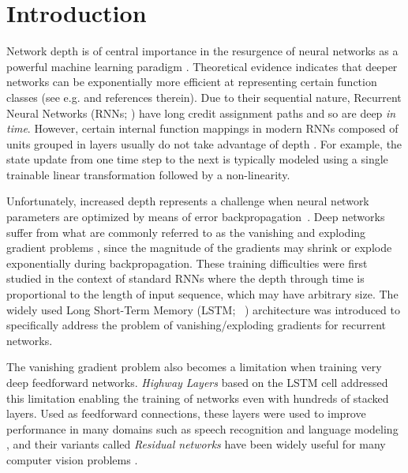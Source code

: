 \documentclass[letterpaper]{article}
\def\srnn{standard RNN}
\begin{document}
\section{Introduction}
\label{sec:introduction}
Network depth is of central importance in the resurgence of neural networks as a powerful machine learning paradigm \citep{schmidhuber2015deep}.
Theoretical evidence indicates that deeper networks can be exponentially more efficient at representing certain function classes (see e.g. \citet{bengio2007scaling,Bianchini2014} and references therein).
Due to their sequential nature, Recurrent Neural Networks (RNNs; \citealp{RobinsonFallside:87tr,werbos,Williams:89}) have long credit assignment paths and so are deep \emph{in time}.
However, certain internal function mappings in modern RNNs composed of units grouped in layers usually do not take advantage of depth \citep{pascanu}.
For example, the state update from one time step to the next is typically modeled using a single trainable linear transformation followed by a non-linearity.

Unfortunately, increased depth represents a challenge when neural network parameters are optimized by means of error backpropagation~\citep{linnainmaa,linnainmaa1976,werbos1982}. 
Deep networks suffer from what are commonly referred to as the vanishing and exploding gradient problems \citep{hochreiter_vanishing_gradients,bengio1994learning,hochreiter2001gradient}, since the magnitude of the gradients may shrink or explode exponentially during backpropagation. These training difficulties were first studied in the context of \srnn{}s where the depth through time is proportional to the length of input sequence, which may have arbitrary size.
The widely used Long Short-Term Memory (LSTM; ~\citealp{hochreiter,gers_lstm}) architecture was introduced to specifically address the problem of vanishing/exploding gradients for recurrent networks.

The vanishing gradient problem also becomes a limitation when training very deep feedforward networks.
\emph{Highway Layers} \citep{srivastava2015highway} based on the LSTM cell addressed this limitation enabling the training of networks even with hundreds of stacked layers.
Used as feedforward connections, these layers were used to improve performance in many domains such as speech recognition \citep{zhang2016highway} and language modeling \citep{kim2015,jozefowicz2016exploring}, and their variants called \emph{Residual networks} have been widely useful for many computer vision problems \citep{he2015deep}.
\end{document}
